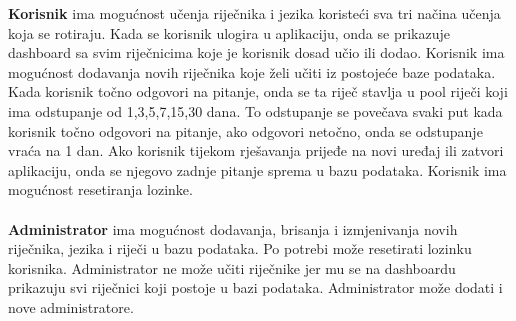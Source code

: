 		\textbf{Korisnik} ima mogućnost učenja riječnika i jezika koristeći sva tri načina učenja koja se rotiraju.
		Kada se korisnik ulogira u aplikaciju, onda se prikazuje dashboard sa svim riječnicima koje je korisnik dosad učio ili dodao.
		Korisnik ima mogućnost dodavanja novih riječnika koje želi učiti iz postojeće baze podataka.
		Kada korisnik točno odgovori na pitanje, onda se ta riječ stavlja u pool riječi koji ima odstupanje od 1,3,5,7,15,30 dana.
		To odstupanje se povečava svaki put kada korisnik točno odgovori na pitanje, ako odgovori netočno, onda se odstupanje vraća na 1 dan.
		Ako korisnik tijekom rješavanja prijeđe na novi uređaj ili zatvori aplikaciju, onda se njegovo zadnje pitanje sprema u bazu podataka.
		Korisnik ima mogućnost resetiranja lozinke.
		\\
		\\
		\textbf{Administrator} ima mogućnost dodavanja, brisanja i izmjenivanja novih riječnika, jezika i riječi u bazu podataka.
		Po potrebi može resetirati lozinku korisnika.
		Administrator ne može učiti riječnike jer mu se na dashboardu prikazuju svi riječnici koji postoje u bazi podataka.
		Administrator može dodati i nove administratore.
		\\
		\\

		\eject
		
	
